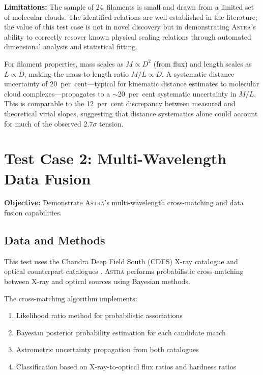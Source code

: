 \documentclass[usenatbib]{rasti}
\newcommand{\astra}{\textsc{Astra}\xspace}
\begin{document}
\textbf{Limitations:} The sample of 24~filaments is small and drawn from a limited set of molecular clouds.
The identified relations are well-established in the literature; the value of this test case is not in novel discovery but in demonstrating \astra's ability to correctly recover known physical scaling relations through automated dimensional analysis and statistical fitting.

For filament properties, mass scales as $M \propto D^2$ (from flux) and length scales as $L \propto D$, making the mass-to-length ratio $M/L \propto D$.
A systematic distance uncertainty of 20~per~cent---typical for kinematic distance estimates to molecular cloud complexes---propagates to a $\sim$20~per~cent systematic uncertainty in $M/L$.
This is comparable to the 12~per~cent discrepancy between measured and theoretical virial slopes, suggesting that distance systematics alone could account for much of the observed $2.7\sigma$ tension.

\section{Test Case 2: Multi-Wavelength Data Fusion}
\label{sec:tc2}

\textbf{Objective:} Demonstrate \astra's multi-wavelength cross-matching and data fusion capabilities.

\subsection{Data and Methods}
\label{sec:tc2:data}

This test uses the Chandra Deep Field South (CDFS) X-ray catalogue \citep{Giacconi2001} and optical counterpart catalogues \citep{Alexander2003,Bauer2004}.
\astra performs probabilistic cross-matching between X-ray and optical sources using Bayesian methods.

The cross-matching algorithm implements:
\begin{enumerate}
  \item[(i)] Likelihood ratio method \citep{SutherlandSaunders1992} for probabilistic associations
  \item[(ii)] Bayesian posterior probability estimation for each candidate match
  \item[(iii)] Astrometric uncertainty propagation from both catalogues
  \item[(iv)] Classification based on X-ray-to-optical flux ratios and hardness ratios
\end{enumerate}
\end{document}
